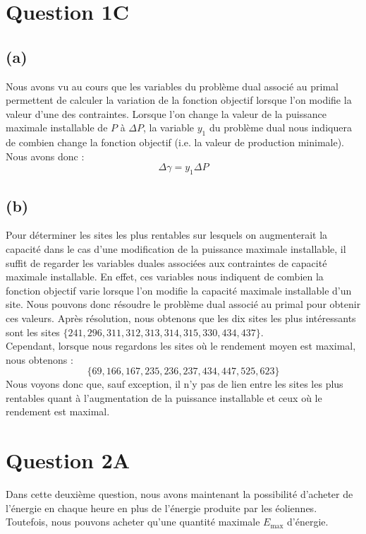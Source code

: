 \documentclass{article}
\begin{document}
\section*{Question 1C}
\subsection*{(a)}
Nous avons vu au cours que les variables du problème dual associé au primal permettent de calculer la variation de la fonction objectif
lorsque l'on modifie la valeur d'une des contraintes. Lorsque l'on change la valeur de la puissance maximale installable de $P$ à $\Delta P$, la variable $y_1$ du problème dual nous indiquera de combien change
la fonction objectif (i.e. la valeur de production minimale). Nous avons donc :
\begin{equation*}
    \Delta \gamma = y_1 \Delta P
\end{equation*}

\subsection*{(b)}
Pour déterminer les sites les plus rentables sur lesquels on augmenterait la capacité dans le cas d'une modification de la puissance maximale installable, il suffit de regarder les variables duales associées aux contraintes de capacité maximale installable. En effet, ces variables nous indiquent de combien la fonction objectif varie lorsque l'on modifie la capacité maximale installable d'un site.
Nous pouvons donc résoudre le problème dual associé au primal pour obtenir ces valeurs. Après résolution, nous obtenons que les dix sites les plus intéressants sont les sites $\{241, 296, 311, 312, 313, 314, 315, 330, 434, 437\}$.\\
Cependant, lorsque nous regardons les sites où le rendement moyen est maximal, nous obtenons : $$\{ 69, 166, 167, 235, 236, 237, 434, 447, 525, 623 \}$$
Nous voyons donc que, sauf exception, il n'y pas de lien entre les sites les plus rentables quant à l'augmentation de la puissance installable et ceux où le rendement est maximal.
\newpage
\section*{Question 2A}
Dans cette deuxième question, nous avons maintenant la possibilité
d'acheter de l'énergie en chaque heure en plus de l'énergie produite par les éoliennes.
Toutefois, nous pouvons acheter qu'une quantité maximale $E_{\text{max}}$ d'énergie.\\
\end{document}
